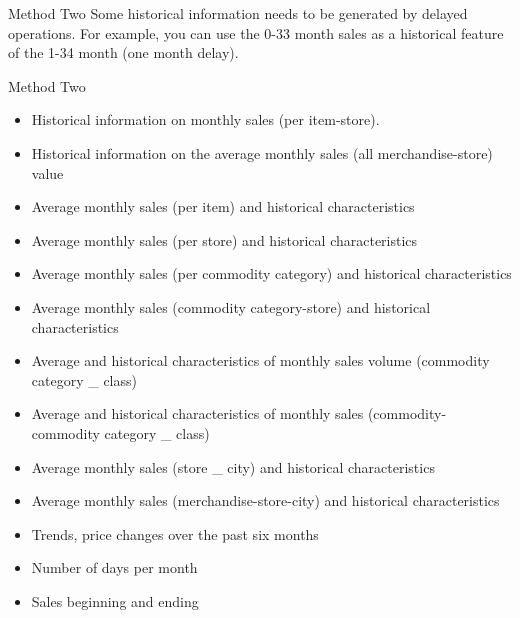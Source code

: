 \documentclass[
 size=14pt,
 paper=smartboard,  %
 mode=present, 		%
 display=slides, 	%
 style=tuliplab,  	%
 pauseslide,
 fleqn,leqno]{powerdot}
\begin{document}
\begin{slide}[toc=,bm=]{Method Two}
  Some historical information needs to be generated by delayed operations. For example, you can use the 0-33 month sales as a historical feature of the 1-34 month (one month delay).
\end{slide}

\begin{slide}[toc=,bm=]{Method Two}
  \begin{itemize}
    \item Historical information on monthly sales (per item-store).
    \item Historical information on the average monthly sales (all merchandise-store) value
    \item Average monthly sales (per item) and historical characteristics
    \item Average monthly sales (per store) and historical characteristics
    \item Average monthly sales (per commodity category) and historical characteristics
    \item Average monthly sales (commodity category-store) and historical characteristics
    \item Average and historical characteristics of monthly sales volume (commodity category _ class)
    \item Average and historical characteristics of monthly sales (commodity-commodity category _ class)
    \item Average monthly sales (store _ city) and historical characteristics
    \item Average monthly sales (merchandise-store-city) and historical characteristics
    \item Trends, price changes over the past six months
    \item Number of days per month
    \item Sales beginning and ending
  \end{itemize}
\end{slide}
\end{document}
